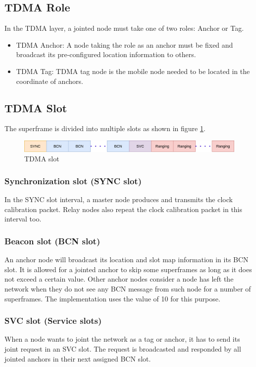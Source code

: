 \documentclass[\main/thesis.tex]{subfiles}
\begin{document}
\subsection{TDMA Role}
In the TDMA layer, a jointed node must take one of two roles: Anchor or Tag.
\begin{itemize}
    \item TDMA Anchor: A node taking the role as an anchor must be fixed and broadcast its pre-configured location information to others.
    \item TDMA Tag: TDMA tag node is the mobile node needed to be located in the coordinate of anchors.
\end{itemize}

\subsection{TDMA Slot}
The superframe is divided into multiple slots as shown in figure \ref{fig:tdma_slot}.
\begin{figure}[ht]
    \begin{center}
        \includegraphics[scale=0.4]{tdma_slot.png}
    \end{center}
    \caption{TDMA slot}
    \label{fig:tdma_slot}
\end{figure}

\subsubsection{Synchronization slot (SYNC slot)}
In the SYNC slot interval, a master node produces and transmits the clock calibration packet. Relay nodes also repeat the clock calibration packet in this interval too.
\subsubsection{Beacon slot (BCN slot)}
An anchor node will broadcast its location and slot map information in its BCN slot. It is allowed for a jointed anchor to skip some superframes as long as it does not exceed a certain value. Other anchor nodes consider a node has left the network when they do not see any BCN message from such node for a number of superframes. The implementation uses the value of 10 for this purpose.
\subsubsection{SVC slot (Service slots)}
When a node wants to joint the network as a tag or anchor, it has to send its joint request in an SVC slot. The request is broadcasted and responded by all jointed anchors in their next assigned BCN slot.
\end{document}
